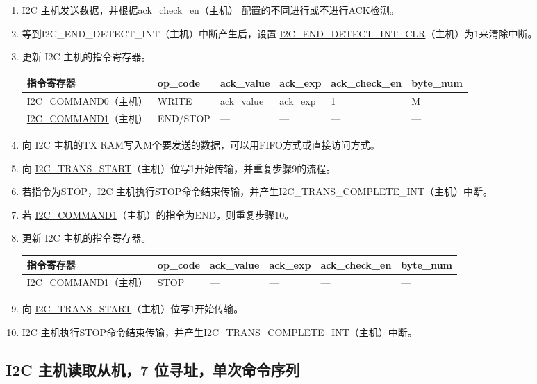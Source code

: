 \documentclass[main\_\_CN.tex]{subfiles}
\begin{document}
\begin{enumerate}
\item I2C 主机发送数据，并根据ack\_check\_en（主机） 配置的不同进行或不进行ACK检测。

\item 等到I2C\_END\_DETECT\_INT（主机）中断产生后，设置 \hyperref[fielddesc:I2CENDDETECTINTCLR]{I2C\_END\_DETECT\_INT\_CLR}（主机）为1来清除中断。
\item 更新 I2C 主机的指令寄存器。
\begin{longtable}{ | p{4cm} | p{2cm} | p{2cm} | p{2cm} |p{2cm} | p{2cm} |}
\hline\rowcolor{lightgray}
指令寄存器& op\_code & ack\_value&ack\_exp&ack\_check\_en&byte\_num  \\ \hline
\hyperref[fielddesc:I2CCOMMAND0]{I2C\_COMMAND0}（主机）& WRITE& ack\_value&ack\_exp&1&M  \\ \hline
\hyperref[fielddesc:I2CCOMMAND1]{I2C\_COMMAND1}（主机）& END/STOP& ---&---&---&---  \\ \hline
\end{longtable} 
\item 向 I2C 主机的TX RAM写入M个要发送的数据，可以用FIFO方式或直接访问方式。
\item 向 \hyperref[fielddesc:I2CTRANSSTART]{I2C\_TRANS\_START}（主机）位写1开始传输，并重复步骤9的流程。
\item 若指令为STOP，I2C 主机执行STOP命令结束传输，并产生I2C\_TRANS\_COMPLETE\_INT（主机）中断。
\item 若 \hyperref[fielddesc:I2CCOMMAND1]{I2C\_COMMAND1}（主机）的指令为END，则重复步骤10。
\item 更新 I2C 主机的指令寄存器。
\begin{longtable}{ | p{4cm} | p{2cm} | p{2cm} | p{2cm} |p{2cm} | p{2cm} |}
\hline\rowcolor{lightgray}
指令寄存器& op\_code & ack\_value&ack\_exp&ack\_check\_en&byte\_num  \\ \hline
\hyperref[fielddesc:I2CCOMMAND1]{I2C\_COMMAND1}（主机）& STOP& ---&---&---&---  \\ \hline
\end{longtable} 
\item 向 \hyperref[fielddesc:I2CTRANSSTART]{I2C\_TRANS\_START}（主机）位写1开始传输。
\item I2C 主机执行STOP命令结束传输，并产生I2C\_TRANS\_COMPLETE\_INT（主机）中断。

\end{enumerate}



\subsection{I2C 主机读取从机，7 位寻址，单次命令序列}
\end{document}
